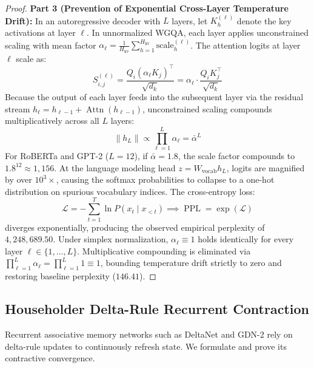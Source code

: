\documentclass{article}
\begin{document}
\begin{proof}
\textbf{Part 3 (Prevention of Exponential Cross-Layer Temperature Drift):}
In an autoregressive decoder with $L$ layers, let $K_h^{(\ell)}$ denote the key activations at layer $\ell$. In unnormalized WGQA, each layer applies unconstrained scaling with mean factor $\alpha_\ell = \frac{1}{H_{\text{kv}}} \sum_{h=1}^{H_{\text{kv}}} \text{scale}_h^{(\ell)}$.
The attention logits at layer $\ell$ scale as:
\begin{equation}
    S_{i, j}^{(\ell)} = \frac{Q_i (\alpha_\ell K_j)^\top}{\sqrt{d_k}} = \alpha_\ell \cdot \frac{Q_i K_j^\top}{\sqrt{d_k}}
\end{equation}
Because the output of each layer feeds into the subsequent layer via the residual stream $h_\ell = h_{\ell-1} + \operatorname{Attn}(h_{\ell-1})$, unconstrained scaling compounds multiplicatively across all $L$ layers:
\begin{equation}
    \|h_L\| \propto \prod_{\ell=1}^L \alpha_\ell = \bar{\alpha}^L
\end{equation}
For RoBERTa and GPT-2 ($L=12$), if $\bar{\alpha} = 1.8$, the scale factor compounds to $1.8^{12} \approx 1{,}156$. At the language modeling head $z = W_{\text{vocab}} h_L$, logits are magnified by over $10^3\times$, causing the softmax probabilities to collapse to a one-hot distribution on spurious vocabulary indices. The cross-entropy loss:
\begin{equation}
    \mathcal{L} = -\sum_{t=1}^T \ln P(x_t \mid x_{<t}) \implies \operatorname{PPL} = \exp(\mathcal{L})
\end{equation}
diverges exponentially, producing the observed empirical perplexity of $4,248,689.50$.
Under simplex normalization, $\alpha_\ell \equiv 1$ holds identically for every layer $\ell \in \{1, \dots, L\}$. Multiplicative compounding is eliminated via $\prod_{\ell=1}^L \alpha_\ell = \prod_{\ell=1}^L 1 \equiv 1$, bounding temperature drift strictly to zero and restoring baseline perplexity ($146.41$).
\end{proof}

\subsection{Householder Delta-Rule Recurrent Contraction}
Recurrent associative memory networks such as DeltaNet and GDN-2 rely on delta-rule updates to continuously refresh state. We formulate and prove its contractive convergence.
\end{document}
